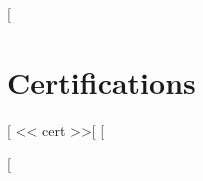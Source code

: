 \documentclass[letterpaper,11pt]{article}
\begin{document}
[%
\section{Certifications}
 \begin{itemize}[leftmargin=0.15in, label={}]
    \small{\item{
     [%
     << cert >>[%
     [%
    }}
 \end{itemize}
[%
\end{document}
